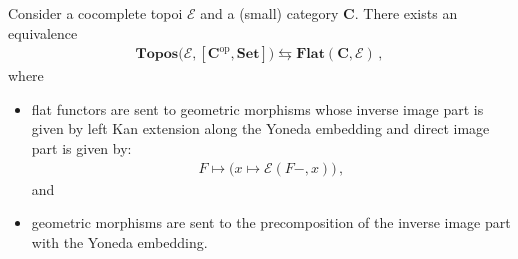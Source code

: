     \begin{theorem}
        Consider a cocomplete topoi $\mathcal{E}$ and a (small) category $\mathbf{C}$. There exists an equivalence
        \begin{gather}
            \mathbf{Topos}\bigl(\mathcal{E},[\mathbf{C}^{\mathrm{op}},\mathbf{Set}]\bigr)\leftrightarrows\mathbf{Flat}(\mathbf{C},\mathcal{E})\,,
        \end{gather}
        where
        \begin{itemize}
            \item flat functors are sent to geometric morphisms whose inverse image part is given by left Kan extension along the Yoneda embedding and direct image part is given by:
            \begin{gather}
                F\mapsto\bigl(x\mapsto\mathcal{E}(F-, x)\bigr)\,,
            \end{gather}
            and
            \item geometric morphisms are sent to the precomposition of the inverse image part with the Yoneda embedding.
        \end{itemize}
    \end{theorem}

